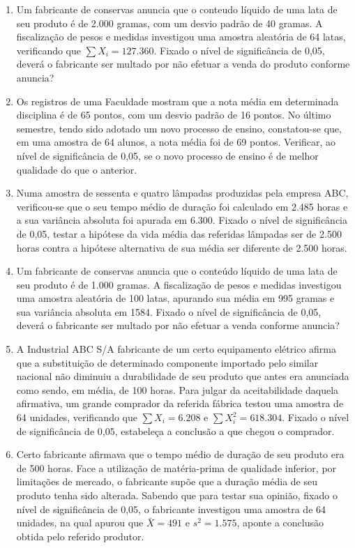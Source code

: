 \begin{enumerate}[resume]
\item Um fabricante de conservas anuncia que o conteudo líquido de uma lata de seu produto é de 2.000 gramas, com um desvio padrão de 40 gramas. A fiscalização de pesos e medidas investigou uma amostra aleatória de 64 latas, verificando que $\sum X_{i}  = 127.360$. Fixado o nível de significância de 0,05, deverá o fabricante ser multado por não efetuar a venda do produto conforme anuncia?

\item Os registros de uma Faculdade mostram que a nota média em determinada disciplina é de 65 pontos, com um desvio padrão de 16 pontos. No último semestre, tendo sido adotado um novo processo de ensino, constatou-se que, em uma amostra de 64 alunos, a nota média foi de 69 pontos. Verificar, ao nível de significância de 0,05, se o novo processo de ensino é de melhor qualidade do que o anterior.

\item Numa amostra de sessenta e quatro lâmpadas produzidas pela empresa ABC, verificou-se que o seu tempo médio de duração foi calculado em 2.485 horas e a sua variância absoluta foi apurada em 6.300. Fixado o nível de significância de 0,05, testar a hipótese da vida média das referidas lâmpadas ser de 2.500 horas contra a hipótese alternativa de sua média ser diferente de 2.500 horas.

\item Um fabricante de conservas anuncia que o conteúdo líquido de uma lata de seu produto é de 1.000 gramas. A fiscalização de pesos e medidas investigou uma amostra aleatória de 100 latas, apurando sua média em 995 gramas e sua variância absoluta em 1584. Fixado o nível de significância de 0,05, deverá o fabricante ser multado por não efetuar a venda conforme anuncia?

\item A Industrial ABC S/A fabricante de um certo equipamento elétrico afirma que a substituição de determinado componente importado pelo similar nacional não diminuiu a durabilidade de seu produto que antes era anunciada como sendo, em média, de 100 horas. Para julgar da aceitabilidade daquela afirmativa, um grande comprador da referida fábrica testou uma amostra de 64 unidades, verificando que $\sum X_{i} = 6.208$ e $\sum X_{i} ^{2} = 618.304$. Fixado o nível de significância de 0,05, estabeleça a conclusão a que chegou o comprador.

\item Certo fabricante afirmava que o tempo médio de duração de seu produto era de 500 horas. Face a utilização de matéria-prima de qualidade inferior, por limitações de mercado, o fabricante supõe que a duração média de seu produto tenha sido alterada. Sabendo que para testar sua opinião, fixado o nível de significância de 0,05, o fabricante investigou uma amostra de 64 unidades, na qual apurou que $\bar{X}= 491$ e $s^{2} = 1.575$, aponte a conclusão obtida pelo referido produtor.


\end{enumerate}
